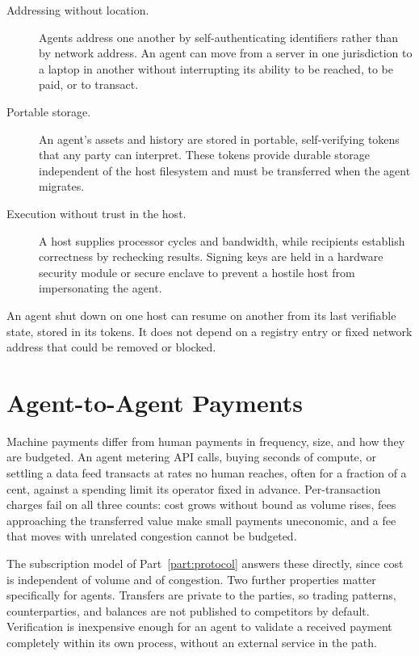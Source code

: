 \begin{description}
    \item[Addressing without location.] Agents address one another by self-authenticating identifiers rather than by network address. An agent can move from a server in one jurisdiction to a laptop in another without interrupting its ability to be reached, to be paid, or to transact.

    \item[Portable storage.] An agent's assets and history are stored in portable, self-verifying tokens that any party can interpret. These tokens provide durable storage independent of the host filesystem and must be transferred when the agent migrates.

    \item[Execution without trust in the host.] A host supplies processor cycles and bandwidth, while recipients establish correctness by rechecking results. Signing keys are held in a hardware security module or secure enclave to prevent a hostile host from impersonating the agent.
\end{description}

An agent shut down on one host can resume on another from its last verifiable state, stored in its tokens. It does not depend on a registry entry or fixed network address that could be removed or blocked.

\section{Agent-to-Agent Payments}

Machine payments differ from human payments in frequency, size, and how they are budgeted. An agent metering API calls, buying seconds of compute, or settling a data feed transacts at rates no human reaches, often for a fraction of a cent, against a spending limit its operator fixed in advance. Per-transaction charges fail on all three counts: cost grows without bound as volume rises, fees approaching the transferred value make small payments uneconomic, and a fee that moves with unrelated congestion cannot be budgeted.

The subscription model of Part~\ref{part:protocol} answers these directly, since cost is independent of volume and of congestion. Two further properties matter specifically for agents. Transfers are private to the parties, so trading patterns, counterparties, and balances are not published to competitors by default. Verification is inexpensive enough for an agent to validate a received payment completely within its own process, without an external service in the path.

